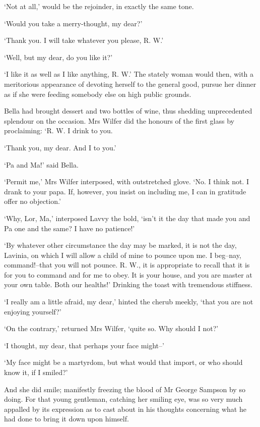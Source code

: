 ‘Not at all,’ would be the rejoinder, in exactly the same tone.

‘Would you take a merry-thought, my dear?’

‘Thank you. I will take whatever you please, R. W.’

‘Well, but my dear, do you like it?’

‘I like it as well as I like anything, R. W.’ The stately woman would
then, with a meritorious appearance of devoting herself to the general
good, pursue her dinner as if she were feeding somebody else on high
public grounds.

Bella had brought dessert and two bottles of wine, thus shedding
unprecedented splendour on the occasion. Mrs Wilfer did the honours of
the first glass by proclaiming: ‘R. W. I drink to you.

‘Thank you, my dear. And I to you.’

‘Pa and Ma!’ said Bella.

‘Permit me,’ Mrs Wilfer interposed, with outstretched glove. ‘No. I
think not. I drank to your papa. If, however, you insist on including
me, I can in gratitude offer no objection.’

‘Why, Lor, Ma,’ interposed Lavvy the bold, ‘isn’t it the day that made
you and Pa one and the same? I have no patience!’

‘By whatever other circumstance the day may be marked, it is not the
day, Lavinia, on which I will allow a child of mine to pounce upon me.
I beg--nay, command!--that you will not pounce. R. W., it is appropriate
to recall that it is for you to command and for me to obey. It is your
house, and you are master at your own table. Both our healths!’ Drinking
the toast with tremendous stiffness.

‘I really am a little afraid, my dear,’ hinted the cherub meekly, ‘that
you are not enjoying yourself?’

‘On the contrary,’ returned Mrs Wilfer, ‘quite so. Why should I not?’

‘I thought, my dear, that perhaps your face might--’

‘My face might be a martyrdom, but what would that import, or who should
know it, if I smiled?’

And she did smile; manifestly freezing the blood of Mr George Sampson
by so doing. For that young gentleman, catching her smiling eye, was so
very much appalled by its expression as to cast about in his thoughts
concerning what he had done to bring it down upon himself.

